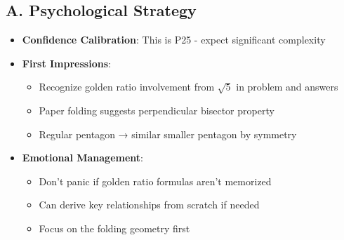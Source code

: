 \documentclass[12pt]{article}
\begin{document}
\begin{strategicbox}
\subsection*{A. Psychological Strategy}
\begin{itemize}[leftmargin=*]
    \item \textbf{Confidence Calibration}: This is P25 - expect significant complexity
    \item \textbf{First Impressions}: 
    \begin{itemize}
        \item Recognize golden ratio involvement from $\sqrt{5}$ in problem and answers
        \item Paper folding suggests perpendicular bisector property
        \item Regular pentagon → similar smaller pentagon by symmetry
    \end{itemize}
    \item \textbf{Emotional Management}: 
    \begin{itemize}
        \item Don't panic if golden ratio formulas aren't memorized
        \item Can derive key relationships from scratch if needed
        \item Focus on the folding geometry first
    \end{itemize}
\end{itemize}


\end{strategicbox}
\end{document}
